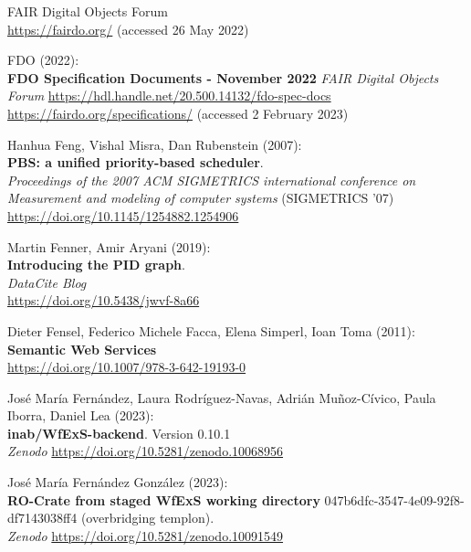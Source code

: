 \begin{thebibliography}{9}
{FAIR Digital Objects Forum} \\
\url{https://fairdo.org/} (accessed 26 May 2022)

FDO (2022): \\
\textbf{{FDO Specification Documents - November 2022}}
\emph{FAIR Digital Objects Forum}
\url{https://hdl.handle.net/20.500.14132/fdo-spec-docs}\\
\url{https://fairdo.org/specifications/} 
(accessed 2 February 2023) 

Hanhua Feng, Vishal Misra, Dan Rubenstein (2007):\\
\textbf{PBS: a unified priority-based scheduler}.\\
\emph{Proceedings of the 2007 ACM SIGMETRICS international conference on Measurement and modeling of computer systems} (SIGMETRICS '07)\\
\url{https://doi.org/10.1145/1254882.1254906} 

Martin Fenner, Amir Aryani (2019): \\
\textbf{Introducing the PID graph}. \\
\emph{DataCite Blog}\\
\url{https://doi.org/10.5438/jwvf-8a66}

Dieter Fensel, Federico Michele Facca, Elena Simperl, Ioan Toma
(2011): \\
\textbf{Semantic {Web Services}}\\
\url{https://doi.org/10.1007/978-3-642-19193-0}

José María Fernández, Laura Rodríguez-Navas, Adrián Muñoz-Cívico, Paula Iborra, Daniel Lea (2023):\\
\textbf{inab/WfExS-backend}. Version 0.10.1\\
\emph{Zenodo}
\url{https://doi.org/10.5281/zenodo.10068956}

José María Fernández González (2023):\\
\textbf{RO-Crate from staged WfExS working directory} 047b6dfc-3547-4e09-92f8-df7143038ff4 (overbridging templon).\\
\emph{Zenodo}
\url{https://doi.org/10.5281/zenodo.10091549}


\end{thebibliography}
